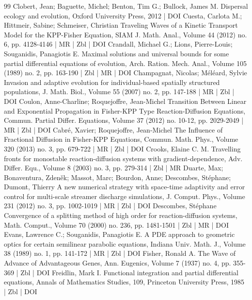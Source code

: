 \begin{thebibliography}{99}
Clobert, Jean; Baguette, Michel; Benton, Tim G.; Bullock, James M. Dispersal ecology and evolution, Oxford University Press, 2012 | DOI
Cuesta, Carlota M.; Hittmeir, Sabine; Schmeiser, Christian Traveling Waves of a Kinetic Transport Model for the KPP-Fisher Equation, SIAM J. Math. Anal., Volume 44 (2012) no. 6, pp. 4128-4146 | MR | Zbl | DOI
Crandall, Michael G.; Lions, Pierre-Louis; Souganidis, Panagiotis E. Maximal solutions and universal bounds for some partial differential equations of evolution, Arch. Ration. Mech. Anal., Volume 105 (1989) no. 2, pp. 163-190 | Zbl | MR | DOI
Champagnat, Nicolas; Méléard, Sylvie Invasion and adaptive evolution for individual-based spatially structured populations, J. Math. Biol., Volume 55 (2007) no. 2, pp. 147-188 | MR | Zbl | DOI
Coulon, Anne-Charline; Roquejoffre, Jean-Michel Transition Between Linear and Exponential Propagation in Fisher-KPP Type Reaction-Diffusion Equations, Commun. Partial Differ. Equations, Volume 37 (2012) no. 10-12, pp. 2029-2049 | MR | Zbl | DOI
Cabré, Xavier; Roquejoffre, Jean-Michel The Influence of Fractional Diffusion in Fisher-KPP Equations, Commun. Math. Phys., Volume 320 (2013) no. 3, pp. 679-722 | MR | Zbl | DOI
Crooks, Elaine C. M. Travelling fronts for monostable reaction-diffusion systems with gradient-dependence, Adv. Differ. Equ., Volume 8 (2003) no. 3, pp. 279-314 | Zbl | MR
Duarte, Max; Bonaventura, Zdeněk; Massot, Marc; Bourdon, Anne; Descombes, Stéphane; Dumont, Thierry A new numerical strategy with space-time adaptivity and error control for multi-scale streamer discharge simulations, J. Comput. Phys., Volume 231 (2012) no. 3, pp. 1002-1019 | MR | Zbl | DOI
Descombes, Stéphane Convergence of a splitting method of high order for reaction-diffusion systems, Math. Comput., Volume 70 (2000) no. 236, pp. 1481-1501 | Zbl | MR | DOI
Evans, Lawrence C.; Souganidis, Panagiotis E. A PDE approach to geometric optics for certain semilinear parabolic equations, Indiana Univ. Math. J., Volume 38 (1989) no. 1, pp. 141-172 | MR | Zbl | DOI
Fisher, Ronald A. The Wave of Advance of Advantageous Genes, Ann. Eugenics, Volume 7 (1937) no. 4, pp. 355-369 | Zbl | DOI
Freidlin, Mark I. Functional integration and partial differential equations, Annals of Mathematics Studies, 109, Princeton University Press, 1985 | Zbl | DOI

\end{thebibliography}
